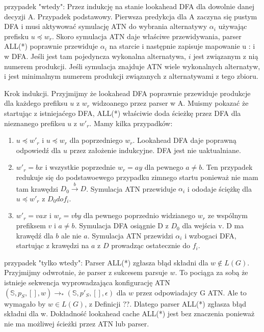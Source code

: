 przypadek "wtedy": Przez indukcję na stanie lookahead DFA dla
dowolnie danej decyzji A. Przypadek podstawowy.
Pierwsza predykcja dla A zaczyna się
pustym DFA i musi aktywować symulację ATN do
wybrania alternatywy $\alpha_i$ używając prefisku $u \preceq w_r$.
Skoro symulacja ATN
daje właściwe przewidywania, parser ALL(*) poprawnie przewiduje
$\alpha_i$ na starcie i następnie zapisuje mapowanie u : i
w DFA. Jeśli jest tam pojedyncza wykonalna alternatywa, $i$ jest
związanym z nią numerem produkcji.
Jeśli symulacja znajduje ATN wiele wykonalnych alternatyw,
i jest minimalnym numerem produkcji związanych
z alternatywami z tego zbioru.
\par
Krok indukcji. Przyjmijmy że lookahead DFA poprawnie przewiduje
produkcje dla każdego prefiksu $u$ z $w_r$ widzoanego przez parser
w A. Muismy pokazać że startując z istniejaćego DFA, ALL(*)
właściwie doda ścieżkę przez DFA dla nieznanego prefiksu $u$
z $w'_r$. Mamy kilka przypadków:
\begin{enumerate}
\item $u \preceq w'_r$ i $u \preceq w_r$ dla poprzedniego $w_r$.
Lookahead DFA daje poprawną odpowiedź dla $u$ przez założenie indukcyjne.
DFA jest nie uaktualniane.
\item $w'_r = bx$ i wszystkie poprzednie $w_r = ay$ dla pewnego $a \neq b$.
Ten przypadek redukuje się do podstawoewego przypadku zimnego startu
ponieważ nie mam tam krawędzi
$D_0 \overset{b}{\rightarrow}D$.
Symulacja ATN przewiduje $\alpha_i$ i ododaje ściężkę
dla $u \preceq w'_r$ z $D_0 do f_i$.
\item $w'_r = vax$ i $w_r = vby$ dla pewnego poprzednio widzianego
$w_r$ ze wspólnym prefiksem $v$ i $a \neq b$.
Symulacja DFA osiągnie D z $D_0$ dla wejścia v.
D ma krawędź dla $b$ ale nie $a$.
Symulacja ATN przewidzi $\alpha_i$ i wzbogaci DFA, startując z
krawędzi na $a$ z $D$ prowadząc ostatecznie do $f_i$.
\end{enumerate}
\par
przypadek "tylko wtedy": Parser ALL(*) zgłasza błąd składni dla
$w \notin L(G)$. Przyjmijmy odwrotnie, że parser z sukcesem
parsuje $w$. To pociąga za sobą że istnieje sekwencja wyprowadzająca
konfigurację ATN
$(\mathbb{S}, p_S, [], w) \rightarrow_* (\mathbb{S}, p'_S, [], \epsilon)$
dla $w$
przez odpowiadajcy G ATN. Ale to wymagało by $w \in
L(G)$, z Definicji ??. Dlatego parser ALL(*) zgłasza
błąd składni dla w. Dokładność lookahead cache ALL(*)
jest bez znaczenia ponieważ nie ma możliwej ścieżki przez ATN
lub parser.
\\ \\
